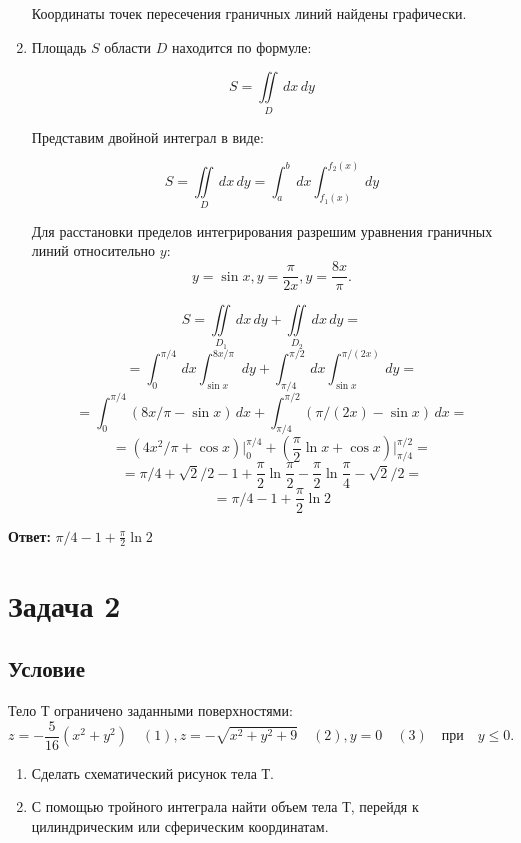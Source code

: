 \documentclass[12pt]{article}
\begin{document}
\begin{enumerate}[wide, labelwidth=!, labelindent=0pt]
		Координаты точек пересечения граничных линий найдены графически.
		
		\item Площадь $S$ области $D$ находится по формуле:
		
		$$S=\iint \limits_{D} \,d x\,d y$$
		
		\newpage		
		Представим двойной интеграл в виде:
		
		$$S=\iint \limits_{D} \,d x\,d y = \int_{a}^{b} \,dx \int_{f_1(x)}^{f_2(x)} \,dy$$
		
		Для расстановки пределов интегрирования разрешим уравнения граничных линий относительно $y$:
		$$y=\sin x, y=\frac{\pi}{2x}, y=\frac{8x}{\pi}.$$

		$$S= \iint \limits_{D_1} \,d x\,d y + \iint \limits_{D_2} \,d x\,d y=$$
		$$= \int_{0}^{\pi/4} \,dx \int_{\sin x}^{8x / \pi} \,dy + \int_{\pi/4}^{\pi/2} \,dx \int_{\sin x}^{\pi / (2x)} \,dy=$$
		$$= \int_{0}^{\pi/4}(8x/\pi  - \sin x) \,dx + \int_{\pi/4}^{\pi/2}(\pi/(2x) - \sin x ) \,dx=$$
		$$=(4x^{2}/\pi + \cos x)\Big|_0^{\pi/4} + (\frac{\pi}{2}\ln x+ \cos x)\Big|_{\pi/4}^{\pi/2}=$$
		$$ =\pi/4 + \sqrt{2}/2 - 1 +\frac{\pi}{2}\ln{\frac{\pi}{2}} - \frac{\pi}{2}\ln{\frac{\pi}{4}} -\sqrt{2}/2=$$
		$$= \pi/4-1+\frac{\pi}{2}\ln{2}$$
					
	\end{enumerate}		
	\hspace{290pt}\textbf{Ответ:} $\pi/4-1+\frac{\pi}{2}\ln{2}$	
	
	\newpage
	\section*{Задача 2}	
	\subsection*{Условие}
	Тело $Т$ ограничено заданными поверхностями: $$z=-\frac{5}{16}(x^2+y^2)\quad(1), z=-\sqrt{x^2+y^2 + 9}\quad(2), y=0\quad(3) \quad \textrm{при} \quad y \leq 0.$$
	
	\begin{enumerate}
		\item Сделать схематический рисунок тела $Т$.
		\item С помощью тройного интеграла найти объем тела $Т$, перейдя к цилиндрическим или сферическим координатам. 
	\end{enumerate}
	
\end{document}
